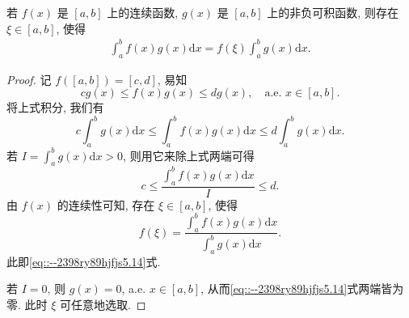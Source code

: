 \documentclass[../../main.tex]{subfiles}%
\begin{document}
\begin{theorem}[积分第一中值公式]\label{theorem:实变函数--积分第一中值公式}
若 $f(x)$ 是 $[a,b]$ 上的连续函数, $g(x)$ 是 $[a,b]$ 上的非负可积函数, 则存在 $\xi\in[a,b]$, 使得
\begin{align}
\int_a^b f(x)g(x)\mathrm{d}x = f(\xi)\int_a^b g(x)\mathrm{d}x. \label{eq::--2398ry89hjfjs5.14}
\end{align}
\end{theorem}
\begin{proof}
记 $f([a,b])=[c,d]$, 易知
\[
cg(x) \leqslant f(x)g(x) \leqslant dg(x),\quad \text{a.e. } x\in[a,b].
\]
将上式积分, 我们有
\[
c\int_a^b g(x)\mathrm{d}x \leqslant \int_a^b f(x)g(x)\mathrm{d}x \leqslant d\int_a^b g(x)\mathrm{d}x.
\]
若 $I = \int_a^b g(x)\mathrm{d}x > 0$, 则用它来除上式两端可得
\[
c \leqslant \frac{\int_a^b f(x)g(x)\mathrm{d}x}{I} \leqslant d.
\]
由 $f(x)$ 的连续性可知, 存在 $\xi\in[a,b]$, 使得
\[
f(\xi) = \frac{\int_a^b f(x)g(x)\mathrm{d}x}{\int_a^b g(x)\mathrm{d}x}.
\]
此即\eqref{eq::--2398ry89hjfjs5.14}式.

若 $I=0$, 则 $g(x)=0$, a.e. $x\in[a,b]$, 从而\eqref{eq::--2398ry89hjfjs5.14}式两端皆为零. 此时 $\xi$ 可任意地选取.
\end{proof}
\end{document}
